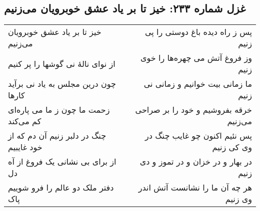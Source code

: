 \begin{center}
\section*{غزل شماره ۲۳۳: خیز تا بر یاد عشق خوبرویان می‌زنیم}
\label{sec:233}
\begin{longtable}{l p{0.5cm} r}
خیز تا بر یاد عشق خوبرویان می‌زنیم
&&
پس ز راه دیده باغ دوستی را پی زنیم
\\
از نوای نالهٔ نی گوشها را پر کنیم
&&
وز فروغ آتش می چهره‌ها را خوی زنیم
\\
چون درین مجلس به یاد نی برآید کارها
&&
ما زمانی بیت خوانیم و زمانی نی زنیم
\\
زحمت ما چون ز ما می پاره‌ای کم می‌کند
&&
خرقه بفروشیم و خود را بر صراحی می‌زنیم
\\
چنگ در دلبر زنیم آن دم که از خود غایبیم
&&
پس نئیم اکنون چو غایب چنگ در وی کی زنیم
\\
از برای بی نشانی یک فروغ از آه دل
&&
در بهار و در خزان و در تموز و دی زنیم
\\
دفتر ملک دو عالم را فرو شوییم پاک
&&
هر چه آن ما را نشانست آتش اندر وی زنیم
\\
\end{longtable}
\end{center}
